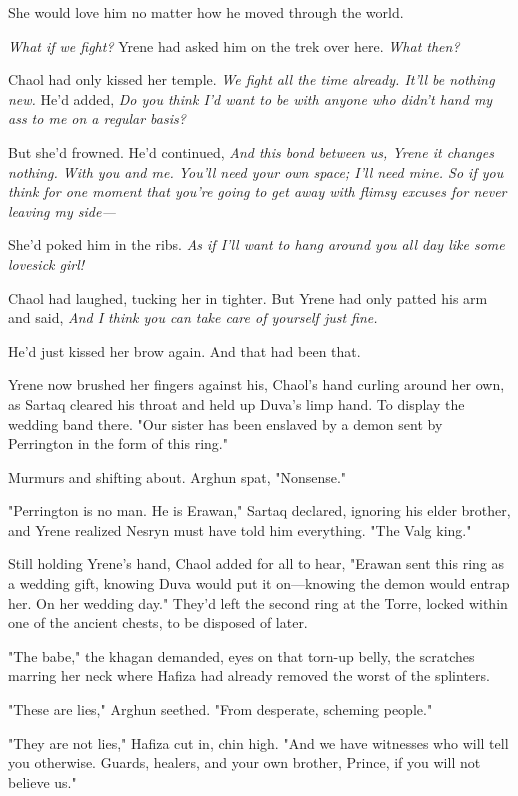 She would love him no matter how he moved through the world.

\emph{What if we fight?} Yrene had asked him on the trek over here.
\emph{What then?}

Chaol had only kissed her temple.
\emph{We fight all the time already.
It'll be nothing new.} He'd added, \emph{Do you think I'd want to be with anyone who didn't hand my ass to me on a regular basis?}

But she'd frowned.
He'd continued, \emph{And this bond between us, Yrene  it changes nothing.
With you and me.
You'll need your own space; I'll need mine.
So if you think for one moment that you're going to get away with flimsy excuses for never leaving my side---}

She'd poked him in the ribs.
\emph{As if I'll want to hang around you all day like some lovesick girl!}

Chaol had laughed, tucking her in tighter.
But Yrene had only patted his arm and said, \emph{And I think you can take care of yourself just fine.}

He'd just kissed her brow again.
And that had been that.

Yrene now brushed her fingers against his, Chaol's hand curling around her own, as Sartaq cleared his throat and held up Duva's limp hand.
To display the wedding band there.
"Our sister has been enslaved by a demon sent by Perrington in the form of this ring."

Murmurs and shifting about.
Arghun spat, "Nonsense."

"Perrington is no man.
He is Erawan," Sartaq declared, ignoring his elder brother, and Yrene realized Nesryn must have told him everything.
"The Valg king."

Still holding Yrene's hand, Chaol added for all to hear, "Erawan sent this ring as a wedding gift, knowing Duva would put it on---knowing the demon would entrap her.
On her wedding day."
They'd left the second ring at the Torre, locked within one of the ancient chests, to be disposed of later.

"The babe," the khagan demanded, eyes on that torn-up belly, the scratches marring her neck where Hafiza had already removed the worst of the splinters.

"These are lies," Arghun seethed.
"From desperate, scheming people."

"They are not lies," Hafiza cut in, chin high.
"And we have witnesses who will tell you otherwise.
Guards, healers, and your own brother, Prince, if you will not believe us."

